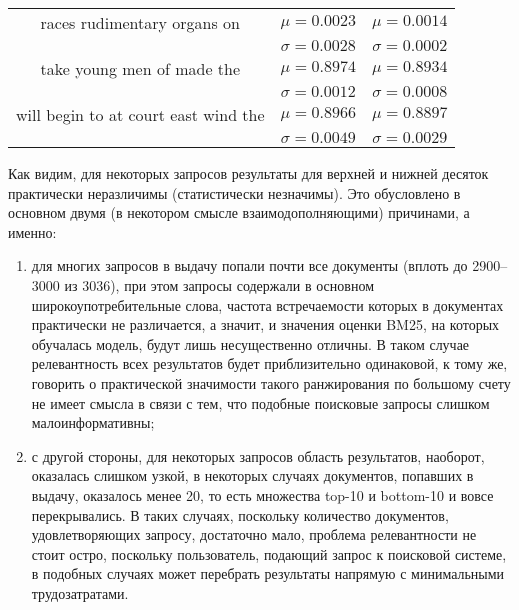\begin{table}[tbp]
\begin{center}
\begin{tabular}{ccc}
            \midrule
            races  rudimentary organs on              & \(\mu=0.0023\)                                    & \(\mu=0.0014\)              \\
                                                      & \(\sigma=0.0028\)                                 & \(\sigma=0.0002\)           \\
            \midrule
            take young men of made the                & \(\mu=0.8974\)                                    & \(\mu=0.8934\)              \\
                                                      & \(\sigma=0.0012\)                                 & \(\sigma=0.0008\)           \\
            \midrule
            will begin to at court east wind the      & \(\mu=0.8966\)                                    & \(\mu=0.8897\)              \\
                                                      & \(\sigma=0.0049\)                                 & \(\sigma=0.0029\)           \\
            \bottomrule
        \end{tabular}\label{tab5}
    \end{center}
\end{table}

Как видим, для некоторых запросов результаты для верхней и нижней десяток практически неразличимы (статистически незначимы).
Это обусловлено в основном двумя (в некотором смысле взаимодополняющими) причинами, а именно:
\begin{enumerate}[1)]
    \item для многих запросов в выдачу попали почти все документы (вплоть до 2900--3000 из 3036), при этом запросы содержали в основном 
          широкоупотребительные слова, частота встречаемости которых в документах практически не различается, а значит, и значения оценки BM25,
          на которых обучалась модель, будут лишь несущественно отличны. В таком случае релевантность всех результатов будет приблизительно 
          одинаковой, к тому же, говорить о практической значимости такого ранжирования по большому счету не имеет смысла в связи с тем,
          что подобные поисковые запросы слишком малоинформативны;
    \item с другой стороны, для некоторых запросов область результатов, наоборот, оказалась слишком узкой, в некоторых случаях документов,
          попавших в выдачу, оказалось менее 20, то есть множества top-10 и bottom-10 и вовсе перекрывались. В таких случаях, поскольку
          количество документов, удовлетворяющих запросу, достаточно мало, проблема релевантности не стоит остро, поскольку пользователь,
          подающий запрос к поисковой системе, в подобных случаях может перебрать результаты напрямую с минимальными трудозатратами.
\end{enumerate}

